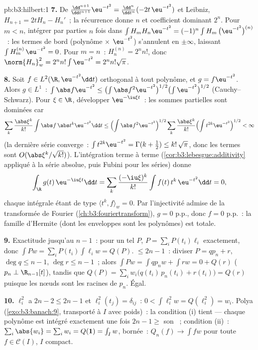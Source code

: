 \begin{solution}{pb:b3:hilbert:1}
\textbf{7.} De $\frac{\dd^{n+1}}{\dd t^{n+1}}\eu^{-t^2} =
\frac{\dd^n}{\dd t^n}(-2t\,\eu^{-t^2})$ et Leibniz, $H_{n+1}
= 2tH_n - H_n'$~; la récurrence donne  $n$ et
coefficient dominant $2^n$. Pour $m < n$, intégrer par
parties $n$ fois dans $\int H_m H_n\eu^{-t^2} =
(-1)^n\int H_m\,\bigl(\eu^{-t^2}\bigr)^{(n)}$~: les termes de
bord (polynôme $\times$ $\eu^{-t^2}$) s'annulent en
$\pm\infty$, laissant $\int H_m^{(n)}\,\eu^{-t^2} = 0$. Pour
$m = n$~: $H_n^{(n)} = 2^nn!$, donc $\norm{H_n}_w^2 =
2^nn!\int\eu^{-t^2} = 2^nn!\sqrt\pi$.

\textbf{8.} Soit $f \in L^2(\R, \eu^{-t^2}\dd t)$ orthogonal
à tout polynôme, et $g = f\eu^{-t^2}$. Alors $g \in L^1$~:
$\int\abs f\eu^{-t^2} \leq \bigl(\int\abs
f^2\eu^{-t^2}\bigr)^{1/2}\bigl(\int\eu^{-t^2}\bigr)^{1/2}$
(Cauchy--Schwarz). Pour $\xi \in \R$, développer
$\eu^{-\iu\xi t}$~: les sommes partielles sont dominées car
\[
\sum_k\frac{\abs\xi^k}{k!}\int\abs f\,\abs t^k\eu^{-t^2}\dd t
\leq \Bigl(\int \abs f^2\eu^{-t^2}\Bigr)^{1/2}
\sum_k\frac{\abs\xi^k}{k!}\Bigl(\int
t^{2k}\eu^{-t^2}\Bigr)^{1/2} < \infty
\]
(la dernière série converge~: $\int t^{2k}\eu^{-t^2} =
\Gamma(k+\frac12) \leq k!\,\sqrt\pi$, donc les termes sont
$O(\abs\xi^k/\sqrt{k!})$). L'intégration terme à terme
(\cref{cor:b3:lebesgue:additivity} appliqué à la série
absolue, puis Fubini pour les séries) donne
\[
\int_\R g(t)\,\eu^{-\iu\xi t}\dd t
= \sum_k\frac{(-\iu\xi)^k}{k!}\int f(t)\,t^k\,\eu^{-t^2}\dd t
= 0 ,
\]
chaque intégrale étant de type $\langle t^k, f\rangle_w = 0$.
Par l'injectivité admise de la transformée de Fourier
(\cref{ch:b3:fouriertransform}), $g = 0$ p.p., donc $f = 0$
p.p.~: la famille d'Hermite (dont les enveloppes sont les
polynômes) est totale.

\textbf{9.} Exactitude jusqu'au  $n - 1$~: pour un tel
$P$, $P = \sum_iP(t_i)\ell_i$ exactement, donc $\int Pw =
\sum_iP(t_i)\int \ell_iw = Q(P)$.  $\leq 2n - 1$~:
diviser $P = qp_n + r$, $\deg q \leq n - 1$, $\deg r \leq
n-1$~; alors $\int Pw = \int qp_nw + \int rw = 0 + Q(r)$
($p_n \perp \R_{n-1}[t]$), tandis que $Q(P) =
\sum_iw_i\bigl(q(t_i)\,p_n(t_i) + r(t_i)\bigr) = Q(r)$
puisque les nœuds sont les racines de $p_n$. Égal.

\textbf{10.} $\ell_i^2$ a  $2n - 2 \leq 2n - 1$ et
$\ell_i^2(t_j) = \delta_{ij}$~: $0 < \int\ell_i^2w =
Q(\ell_i^2) = w_i$. Polya (\cref{exo:b3:banach:9},
transporté à $I$ avec poids)~: la condition (i) tient ---
chaque polynôme est intégré exactement une fois $2n - 1
\geq$ son ~; condition (ii)~: $\sum_i\abs{w_{i}} =
\sum_iw_i = Q(\mathbf 1) = \int_Iw$, bornée~: $Q_n(f) \to
\int fw$ pour toute $f \in \mathcal C(I)$, $I$ compact.


\end{solution}
